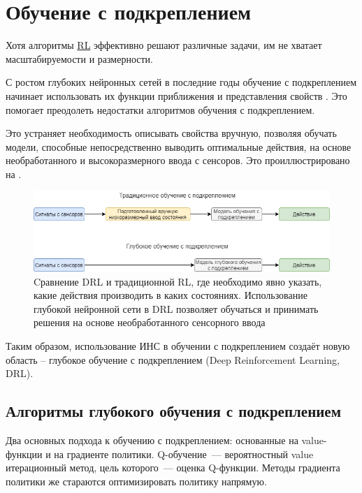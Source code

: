 \section{Обучение с подкреплением} \label{ch1:rl}

Хотя алгоритмы \hyperref[acr:rl]{RL} эффективно решают различные задачи, им не хватает масштабируемости и размерности.

С ростом глубоких нейронных сетей в последние годы обучение с подкреплением начинает использовать их функции приближения и представления свойств \cite{HORNIK1991251}. Это помогает преодолеть недостатки алгоритмов обучения с подкреплением.

Это устраняет необходимость описывать свойства вручную, позволяя обучать модели, способные непосредственно выводить оптимальные действия, на основе необработанного и высокоразмерного ввода с сенсоров. Это проиллюстрировано на .

\begin{figure}[ht!]
    \center
    \includegraphics [scale=0.65] {my_folder/images/ch1/DRL-flow.png}
    \caption{Cравнение DRL и традиционной RL, где необходимо явно указать, какие действия производить в каких состояниях. Использование глубокой нейронной сети в DRL позволяет обучаться и принимать решения на основе необработанного сенсорного ввода}
    \label{fig:DRL-flow}
\end{figure}

Таким образом, использование ИНС в обучении с подкреплением создаёт новую область – глубокое обучение с подкреплением (Deep Reinforcement Learning, DRL).

\subsection{Алгоритмы глубокого обучения с подкреплением}

Два основных подхода к обучению с подкреплением: основанные на value-функции и на градиенте политики. Q-обучение~--- вероятностный value итерационный метод, цель которого~--- оценка Q-функции. Методы градиента политики же стараются оптимизировать политику напрямую.

